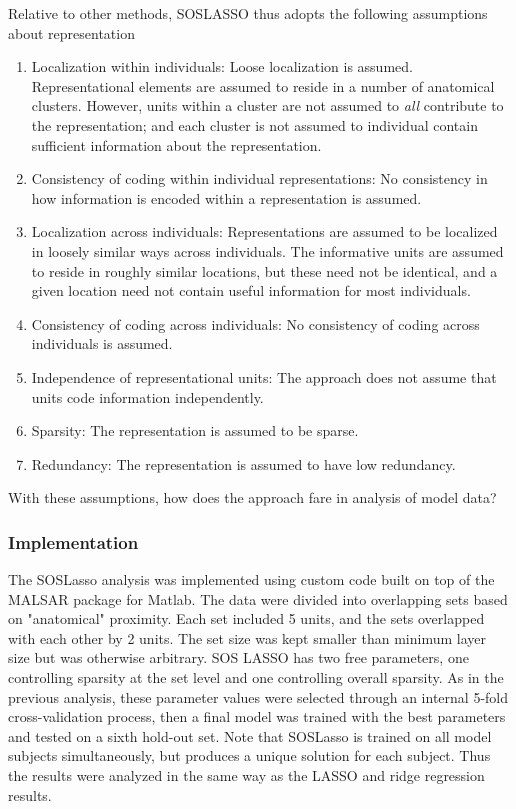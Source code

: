 Relative to other methods, SOSLASSO thus adopts the following assumptions about representation
\begin{enumerate}
\item Localization within individuals: Loose localization is assumed. Representational elements are assumed to reside in a number of anatomical clusters. However, units within a cluster are not assumed to {\em all} contribute to the representation; and each cluster is not assumed to individual contain sufficient information about the representation.

\item Consistency of coding within individual representations: No consistency in how information is encoded within a representation is assumed.

\item Localization across individuals: Representations are assumed to be localized in loosely similar ways across individuals. The informative units are assumed to reside in roughly similar locations, but these need not be identical, and a given location need not contain useful information for most individuals.

\item Consistency of coding across individuals: No consistency of coding across individuals is assumed.

\item Independence of representational units: The approach does not assume that units code information independently.

\item Sparsity: The representation is assumed to be sparse.

\item Redundancy: The representation is assumed to have low redundancy.
\end{enumerate}

With these assumptions, how does the approach fare in analysis of model data?

\subsubsection{Implementation} 
The SOSLasso analysis was implemented using custom code built on top of the MALSAR package\cite{malsar} for Matlab. The data were divided into overlapping sets based on "anatomical" proximity. Each set included 5 units, and the sets overlapped with each other by 2 units. The set size was kept smaller than minimum layer size but was otherwise arbitrary. SOS LASSO has two free parameters, one controlling sparsity at the set level and one controlling overall sparsity. As in the previous analysis, these parameter values  were selected through an internal 5-fold cross-validation process, then a final model was trained with the best parameters and tested on a sixth hold-out set. Note that SOSLasso is trained on all model subjects simultaneously, but produces a unique solution for each subject. Thus the results were analyzed in the same way as the LASSO and ridge regression results.

